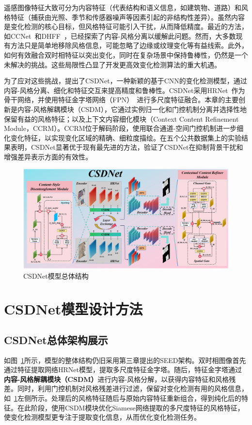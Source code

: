 遥感图像特征大致可分为内容特征（代表结构和语义信息，如建筑物、道路）和风格特征（捕获由光照、季节和传感器噪声等因素引起的非结构性差异）。虽然内容是变化检测的核心目标，但风格特征可能引入干扰，从而降低精度。最近的方法，如CCNet~\cite{cheng2024harmony}和DHFF~\cite{jiang2020change}，已经探索了内容-风格分离以缓解此问题。然而，大多数现有方法只是简单地移除风格信息，可能忽略了边缘或纹理变化等有益线索。此外，如何有效融合双时相特征以突出变化，同时在复杂场景中保持鲁棒性，仍然是一个未解决的挑战。这些局限性凸显了开发更高效变化检测算法的重大机遇。

为了应对这些挑战，提出了CSDNet，一种新颖的基于CNN的变化检测模型，通过内容-风格分离、细化和特征交互来提高精度和鲁棒性。CSDNet采用HRNet~\cite{Wang2019DeepHR}作为骨干网络，并使用特征金字塔网络（FPN）~\cite{lin_feature_2017}进行多尺度特征融合。本章的主要创新是内容-风格解耦模块（CSDM），它通过实例归一化和门控机制分离并选择性地保留有益的风格特征；以及上下文内容细化模块（Context Content Refinement Module，CCRM）。CCRM位于解码阶段，使用联合通道-空间门控机制进一步细化变化特征，以实现变化区域的精确、细粒度描绘。在五个公共数据集上的实验结果表明，CSDNet显著优于现有最先进的方法，验证了CSDNet在抑制背景干扰和增强差异表示方面的有效性。




\begin{figure}[!htb]
	\centering
	\includegraphics[width=\textwidth]{paper_figures/基于双时相遥感影像风格解缠和内容细化增强遥感变化检测方法/CSDNet.png}
	\caption{CSDNet模型总体结构}
	\label{fig:CSDNet}
\end{figure}



\section{CSDNet模型设计方法}
\subsection{CSDNet总体架构展示}
如图~\ref{fig:CSDNet}所示，模型的整体结构仍旧采用第三章提出的SEED架构。双时相图像首先通过特征提取网络HRNet模型，提取多尺度特征金字塔。随后，特征金字塔通过\textbf{内容-风格解耦模块（CSDM）}进行内容-风格分解，以获得内容特征和风格残差。同时，利用门控机制对风格残差进行过滤，保留对变化检测有用的风格信息，如~\ref{fig:CSDNet}左侧所示。处理后的风格特征随后与原始内容特征重新组合，得到纯化后的特征。在此阶段，使用CSDM模块优化Siamese网络提取的多尺度特征的风格特征，使变化检测模型更专注于提取变化信息，从而优化变化检测任务。

